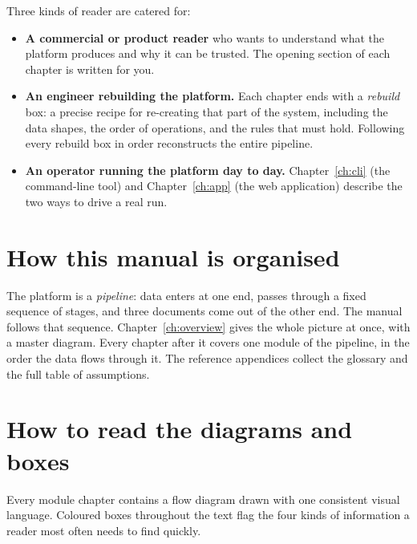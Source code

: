 Three kinds of reader are catered for:

\begin{itemize}
  \item \textbf{A commercial or product reader} who wants to understand what the platform produces and why it can be trusted. The opening section of each chapter is written for you.
  \item \textbf{An engineer rebuilding the platform.} Each chapter ends with a \emph{rebuild} box: a precise recipe for re-creating that part of the system, including the data shapes, the order of operations, and the rules that must hold. Following every rebuild box in order reconstructs the entire pipeline.
  \item \textbf{An operator running the platform day to day.} Chapter~\ref{ch:cli} (the command-line tool) and Chapter~\ref{ch:app} (the web application) describe the two ways to drive a real run.
\end{itemize}

\section{How this manual is organised}

The platform is a \emph{pipeline}: data enters at one end, passes through a fixed sequence of stages, and three documents come out of the other end. The manual follows that sequence. Chapter~\ref{ch:overview} gives the whole picture at once, with a master diagram. Every chapter after it covers one module of the pipeline, in the order the data flows through it. The reference appendices collect the glossary and the full table of assumptions.

\section{How to read the diagrams and boxes}

Every module chapter contains a flow diagram drawn with one consistent visual language. Coloured boxes throughout the text flag the four kinds of information a reader most often needs to find quickly.

